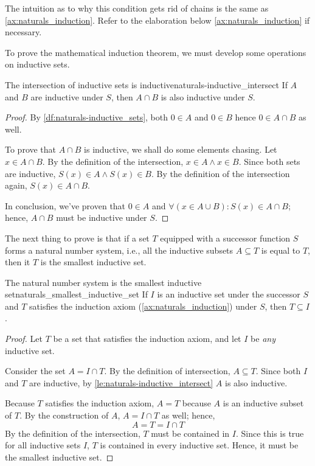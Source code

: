 The intuition as to why this condition gets rid of chains is the same as
\cref{ax:naturals_induction}. Refer to the elaboration below \cref{ax:naturals_induction}
if necessary.

To prove the mathematical induction theorem, we must develop some operations on inductive sets.

\begin{lemma}{The intersection of inductive sets is inductive}{naturals-inductive_intersect}
  If \(A\) and \(B\) are inductive under \(S\), then \(A \cap B\) is also inductive under \(S\).
\end{lemma}

\begin{proof}
  By \cref{df:naturals-inductive_sets}, both \(0 \in A\) and \(0 \in B\) hence \(0 \in A \cap B\) as
  well.

  To prove that \(A \cap B\) is inductive, we shall do some elements chasing. Let
  \(x \in A \cap B\). By the definition of the intersection, \(x \in A \land x \in B\). Since both
  sets are inductive, \(S(x) \in A \land S(x) \in B\). By the definition of the intersection again,
  \(S(x) \in A \cap B\).

  In conclusion, we've proven that \(0 \in A\) and \(\forall (x \in A \cup B) : S(x) \in A \cap B\);
  hence, \(A \cap B\) must be inductive under \(S\).
\end{proof}

The next thing to prove is that if a set \(T\) equipped with a successor function \(S\) forms a
natural number system, i.e., all the inductive subsets \(A \subseteq T\) is equal to \(T\), then it
\(T\) is the smallest inductive set.

\begin{lemma}{The natural number system is the smallest inductive set}{naturals_smallest_inductive_set}
  If \(I\) is an inductive set under the successor \(S\) and \(T\) satisfies the induction axiom
  (\cref{ax:naturals_induction}) under \(S\), then \(T \subseteq I\).
\end{lemma}

\begin{proof}
  Let \(T\) be a set that satisfies the induction axiom, and let \(I\) be \emph{any} inductive set.

  Consider the set \(A = I \cap T\). By the definition of intersection, \(A \subseteq T\). Since
  both \(I\) and \(T\) are inductive, by \cref{le:naturals-inductive_intersect} \(A\) is also
  inductive.

  Because \(T\) satisfies the induction axiom, \(A = T\) because \(A\) is an inductive subset of
  \(T\). By the construction of \(A\), \(A = I \cap T\) as well; hence,
  \begin{equation}
    A = T = I \cap T
  \end{equation}
  By the definition of the intersection, \(T\) must be contained in \(I\). Since this is true for
  all inductive sets \(I\), \(T\) is contained in every inductive set. Hence, it must be the
  smallest inductive set.
\end{proof}

